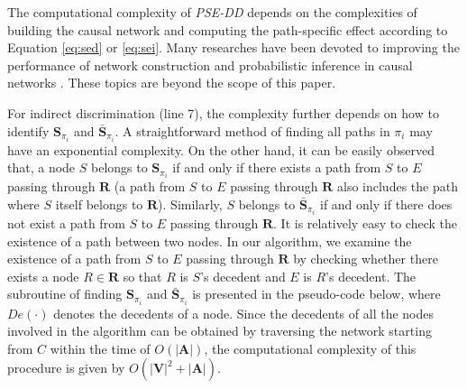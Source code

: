 \documentclass[letterpaper]{article}
\begin{document}
The computational complexity of \emph{PSE-DD} depends on the complexities of building the causal network and computing the path-specific effect according to Equation \eqref{eq:sed} or \eqref{eq:sei}.
Many researches have been devoted to improving the performance of network construction \cite{kalisch2007estimating,tsamardinos2003scaling,aliferis2010local} and probabilistic inference in causal networks \cite{heckerman1994new,heckerman1996causal}.
These topics are beyond the scope of this paper.

For indirect discrimination (line 7), the complexity further depends on how to identify $\mathbf{S}_{\pi_{i}}$ and $\bar{\mathbf{S}}_{\pi_{i}}$. 
A straightforward method of finding all paths in $\pi_{i}$ may have an exponential complexity.
On the other hand, it can be easily observed that, a node $S$ belongs to $\mathbf{S}_{\pi_{i}}$ if and only if there exists a path from $S$ to $E$ passing through $\mathbf{R}$ (a path from $S$ to $E$ passing through $\mathbf{R}$ also includes the path where $S$ itself belongs to $\mathbf{R}$). Similarly, $S$ belongs to $\bar{\mathbf{S}}_{\pi_{i}}$ if and only if there does not exist a path from $S$ to $E$ passing through $\mathbf{R}$. It is relatively easy to check the existence of a path between two nodes. In our algorithm, we examine the existence of a path from $S$ to $E$ passing through $\mathbf{R}$ by checking whether there exists a node $R\in \mathbf{R}$ so that $R$ is $S$'s decedent and $E$ is $R$'s decedent. The subroutine of finding $\mathbf{S}_{\pi_{i}}$ and $\bar{\mathbf{S}}_{\pi_{i}}$ is presented in the pseudo-code below, where $De(\cdot)$ denotes the decedents of a node. Since the decedents of all the nodes involved in the algorithm can be obtained by traversing the network starting from $C$ within the time of $O(|\mathbf{A}|)$, the computational complexity of this procedure is given by $O(|\mathbf{V}|^{2}+|\mathbf{A}|)$.
\end{document}
